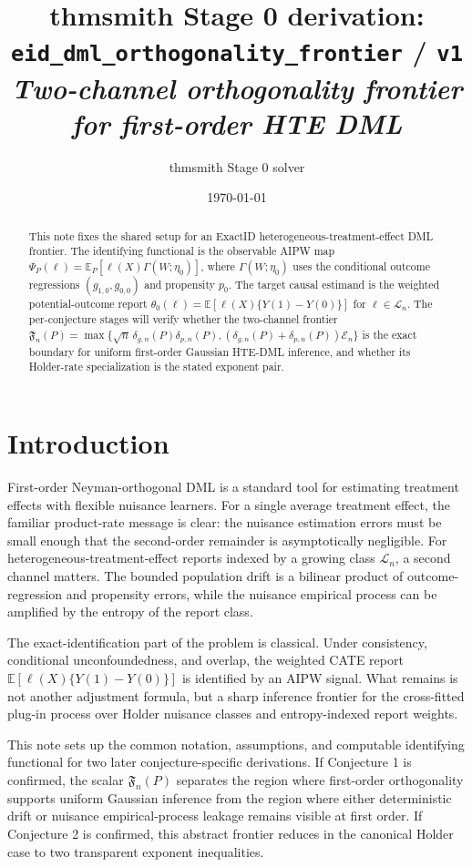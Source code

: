 \documentclass[11pt]{article}
\title{thmsmith Stage 0 derivation: \texttt{eid\_dml\_orthogonality\_frontier} / \texttt{v1}%
  \\ \large\textit{Two-channel orthogonality frontier for first-order HTE DML}}
\author{thmsmith Stage 0 solver}
\date{\today}
\newcommand{\E}{\mathbb{E}}
\theoremstyle{definition}
\theoremstyle{plain}
\theoremstyle{remark}
\begin{document}
\maketitle


\begin{abstract}
This note fixes the shared setup for an ExactID heterogeneous-treatment-effect
DML frontier.  The identifying functional is the observable AIPW map
\(\Psi_P(\ell)=\E_P[\ell(X)\Gamma(W;\eta_0)]\), where
\(\Gamma(W;\eta_0)\) uses the conditional outcome regressions
\((g_{1,0},g_{0,0})\) and propensity \(p_0\).  The target causal estimand is the
weighted potential-outcome report
\(\theta_0(\ell)=\E[\ell(X)\{Y(1)-Y(0)\}]\) for
\(\ell\in\mathcal{L}_n\).  The per-conjecture stages will verify whether the
two-channel frontier
\(\mathfrak{F}_n(P)=\max\{\sqrt n\,\delta_{g,n}(P)\delta_{p,n}(P),
(\delta_{g,n}(P)+\delta_{p,n}(P))\mathcal{E}_n\}\) is the exact boundary for
uniform first-order Gaussian HTE-DML inference, and whether its Holder-rate
specialization is the stated exponent pair.
\end{abstract}

\section{Introduction}
First-order Neyman-orthogonal DML is a standard tool for estimating treatment
effects with flexible nuisance learners.  For a single average treatment effect,
the familiar product-rate message is clear: the nuisance estimation errors must
be small enough that the second-order remainder is asymptotically negligible.
For heterogeneous-treatment-effect reports indexed by a growing class
\(\mathcal{L}_n\), a second channel matters.  The bounded population drift is a
bilinear product of outcome-regression and propensity errors, while the nuisance
empirical process can be amplified by the entropy of the report class.

The exact-identification part of the problem is classical.  Under consistency,
conditional unconfoundedness, and overlap, the weighted CATE report
\(\E[\ell(X)\{Y(1)-Y(0)\}]\) is identified by an AIPW signal.  What remains is
not another adjustment formula, but a sharp inference frontier for the
cross-fitted plug-in process over Holder nuisance classes and entropy-indexed
report weights.

This note sets up the common notation, assumptions, and computable identifying
functional for two later conjecture-specific derivations.  If Conjecture 1 is
confirmed, the scalar \(\mathfrak{F}_n(P)\) separates the region where
first-order orthogonality supports uniform Gaussian inference from the region
where either deterministic drift or nuisance empirical-process leakage remains
visible at first order.  If Conjecture 2 is confirmed, this abstract frontier
reduces in the canonical Holder case to two transparent exponent inequalities.
\end{document}
